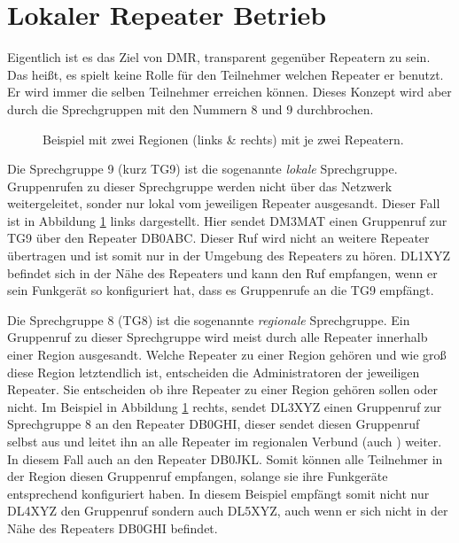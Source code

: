\section{Lokaler Repeater Betrieb} \label{sec:lokal}
Eigentlich ist es das Ziel von DMR, transparent gegenüber Repeatern zu sein. Das heißt, es spielt keine Rolle für den Teilnehmer welchen Repeater er benutzt. Er wird immer die selben Teilnehmer erreichen können. Dieses Konzept wird aber durch die Sprechgruppen mit den Nummern $8$ und $9$ durchbrochen.
 
\begin{figure}[!ht]
 \centering
 
 \caption{Beispiel mit zwei Regionen (links \& rechts) mit je zwei Repeatern.} \label{fig:tg9tg8}
\end{figure}

Die Sprechgruppe 9 (kurz TG9) ist die sogenannte \emph{lokale} Sprechgruppe. Gruppenrufen zu dieser Sprechgruppe werden nicht über das Netzwerk weitergeleitet, sonder nur lokal vom jeweiligen Repeater ausgesandt. Dieser Fall ist in Abbildung \ref{fig:tg9tg8} links dargestellt. Hier sendet DM3MAT einen Gruppenruf zur TG9 über den Repeater DB0ABC. Dieser Ruf wird nicht an weitere Repeater übertragen und ist somit nur in der Umgebung des Repeaters zu hören. DL1XYZ befindet sich in der Nähe des Repeaters und kann den Ruf empfangen, wenn er sein Funkgerät so konfiguriert hat, dass es Gruppenrufe an die TG9 empfängt.    

Die Sprechgruppe 8 (TG8) ist die sogenannte \emph{regionale} Sprechgruppe. Ein Gruppenruf zu dieser Sprechgruppe wird meist durch alle Repeater innerhalb einer Region ausgesandt. Welche Repeater zu einer Region gehören und wie groß diese Region letztendlich ist, entscheiden die Administratoren der jeweiligen Repeater. Sie entscheiden ob ihre Repeater zu einer Region gehören sollen oder nicht. Im Beispiel in Abbildung \ref{fig:tg9tg8} rechts, sendet DL3XYZ einen Gruppenruf zur Sprechgruppe 8 an den Repeater DB0GHI, dieser sendet diesen Gruppenruf selbst aus und leitet ihn an alle Repeater im regionalen Verbund (auch ) weiter. In diesem Fall auch an den Repeater DB0JKL. Somit können alle Teilnehmer in der Region diesen Gruppenruf empfangen, solange sie ihre Funkgeräte entsprechend konfiguriert haben. In diesem Beispiel empfängt somit nicht nur DL4XYZ den Gruppenruf sondern auch DL5XYZ, auch wenn er sich nicht in der Nähe des Repeaters DB0GHI befindet. 